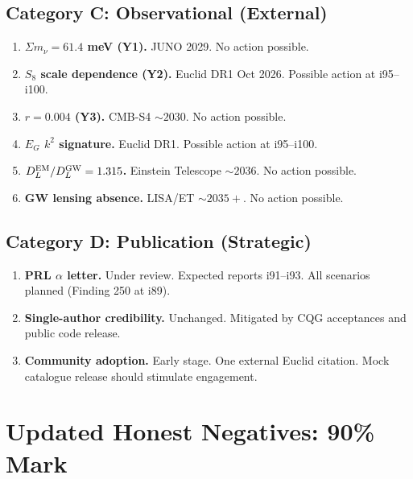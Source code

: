 \documentclass[11pt,a4paper]{article}
\begin{document}
\subsection{Category C: Observational (External)}

\begin{enumerate}[nosep]
\item \textbf{$\Sigma m_\nu = 61.4$ meV (Y1).} JUNO 2029. No action possible.
\item \textbf{$S_8$ scale dependence (Y2).} Euclid DR1 Oct 2026. Possible action at i95--i100.
\item \textbf{$r = 0.004$ (Y3).} CMB-S4 $\sim 2030$. No action possible.
\item \textbf{$E_G$ $k^2$ signature.} Euclid DR1. Possible action at i95--i100.
\item \textbf{$D_L^{\rm EM}/D_L^{\rm GW} = 1.315$.} Einstein Telescope $\sim 2036$. No action possible.
\item \textbf{GW lensing absence.} LISA/ET $\sim 2035+$. No action possible.
\end{enumerate}

\subsection{Category D: Publication (Strategic)}

\begin{enumerate}[nosep]
\item \textbf{PRL $\alpha$ letter.} Under review. Expected reports i91--i93. All scenarios planned (Finding 250 at i89).
\item \textbf{Single-author credibility.} Unchanged. Mitigated by CQG acceptances and public code release.
\item \textbf{Community adoption.} Early stage. One external Euclid citation. Mock catalogue release should stimulate engagement.
\end{enumerate}

\section{Updated Honest Negatives: 90\% Mark}
\end{document}

